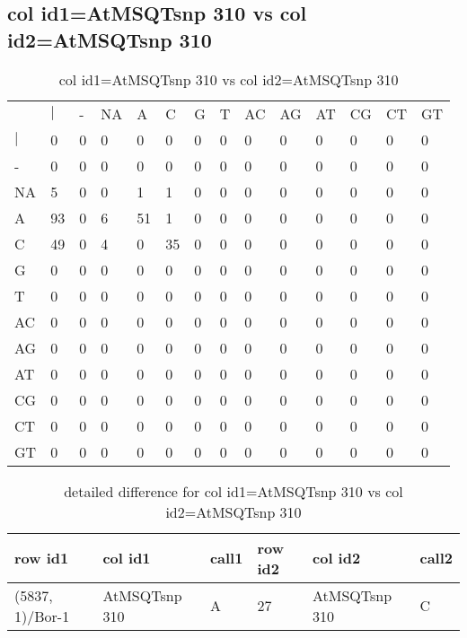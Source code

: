 \subsection{col id1=AtMSQTsnp 310 vs col id2=AtMSQTsnp 310}
\begin{center}
\begin{longtable}{|l|l|l|l|l|l|l|l|l|l|l|l|l|l|}
\caption{col id1=AtMSQTsnp 310 vs col id2=AtMSQTsnp 310} \label{table_dm656}\\
\hline
\\
\hline
&$|$&-&NA&A&C&G&T&AC&AG&AT&CG&CT&GT\\
$|$&0&0&0&0&0&0&0&0&0&0&0&0&0\\
-&0&0&0&0&0&0&0&0&0&0&0&0&0\\
NA&5&0&0&1&1&0&0&0&0&0&0&0&0\\
A&93&0&6&51&1&0&0&0&0&0&0&0&0\\
C&49&0&4&0&35&0&0&0&0&0&0&0&0\\
G&0&0&0&0&0&0&0&0&0&0&0&0&0\\
T&0&0&0&0&0&0&0&0&0&0&0&0&0\\
AC&0&0&0&0&0&0&0&0&0&0&0&0&0\\
AG&0&0&0&0&0&0&0&0&0&0&0&0&0\\
AT&0&0&0&0&0&0&0&0&0&0&0&0&0\\
CG&0&0&0&0&0&0&0&0&0&0&0&0&0\\
CT&0&0&0&0&0&0&0&0&0&0&0&0&0\\
GT&0&0&0&0&0&0&0&0&0&0&0&0&0\\
\hline
\end{longtable}
\end{center}

\begin{center}
\begin{longtable}{|l|l|l|l|l|l|}
\caption{detailed difference for col id1=AtMSQTsnp 310 vs col id2=AtMSQTsnp 310} \label{table_dm657}\\
\hline
row id1&col id1&call1&row id2&col id2&call2\\
\hline
(5837, 1)/Bor-1&AtMSQTsnp 310&A&27&AtMSQTsnp 310&C\\
\hline
\end{longtable}
\end{center}

